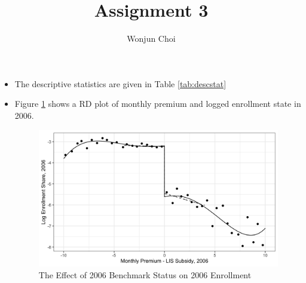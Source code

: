 \documentclass[12pt]{article}
\title{Assignment 3}
\author{Wonjun Choi}
\begin{document}
\maketitle
\begin{itemize}
	\item[1.] The descriptive statistics are given in Table \ref{tab:descstat}
	
	

	
	\item[2.] Figure \ref{fig:rdplot} shows a RD plot of  monthly premium and logged enrollment state in 2006.
	\begin{figure} [ht]
		\centering
		\includegraphics[scale=0.15]{../output/fig_rdplot.jpg}
		\caption{The Effect of 2006 Benchmark Status on 2006 Enrollment}
		\label{fig:rdplot}
	\end{figure}


\end{itemize}
\end{document}
